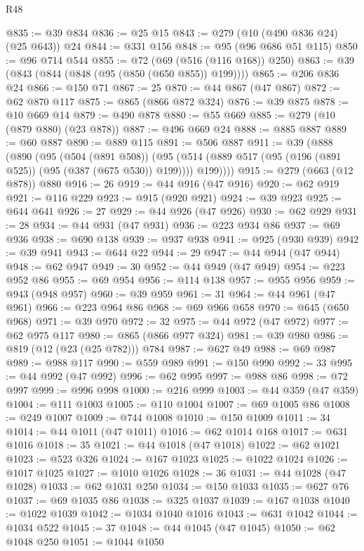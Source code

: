 \begin{lexlean}{R48}
\begin{coremodule}
@835 := @39 @834
@836 := @25 @15
@843 := @279 (@10 (@490 @836 @24) (@25 @643)) @24
@844 := @331 @156
@848 := @95 (@96 @686 @51 @115)
@850 := @96 @714 @544
@855 := @72 (@69 (@516 (@116 @168)) @250)
@863 := @39 (@843 (@844 (@848 (@95 (@850 (@650 @855)) @199))))
@865 := @206 @836 @24
@866 := @150 @71
@867 := 25
@870 := @44 @867 (@47 @867)
@872 := @62 @870 @117
@875 := @865 (@866 @872 @324)
@876 := @39 @875
@878 := @10 @669 @14
@879 := @490 @878
@880 := @55 @669
@885 := @279 (@10 (@879 @880) (@23 @878))
@887 := @496 @669 @24
@888 := @885 @887
@889 := @60 @887
@890 := @889 @115
@891 := @506 @887
@911 := @39
    (@888
      (@890
        (@95
          (@504 (@891 @508))
          (@95 (@514 (@889 @517 (@95 (@196 (@891 @525)) (@95 (@387 (@675 @530)) @199)))) @199))))
@915 := @279 (@663 (@12 @878)) @880
@916 := 26
@919 := @44 @916 (@47 @916)
@920 := @62 @919
@921 := @116 @229
@923 := @915 (@920 @921)
@924 := @39 @923
@925 := @644 @641
@926 := 27
@929 := @44 @926 (@47 @926)
@930 := @62 @929
@931 := 28
@934 := @44 @931 (@47 @931)
@936 := @223 @934 @86
@937 := @69 @936
@938 := @690 @138
@939 := @937 @938
@941 := @925 (@930 @939)
@942 := @39 @941
@943 := @644 @22
@944 := 29
@947 := @44 @944 (@47 @944)
@948 := @62 @947
@949 := 30
@952 := @44 @949 (@47 @949)
@954 := @223 @952 @86
@955 := @69 @954
@956 := @114 @138
@957 := @955 @956
@959 := @943 (@948 @957)
@960 := @39 @959
@961 := 31
@964 := @44 @961 (@47 @961)
@966 := @223 @964 @86
@968 := @69 @966 @658
@970 := @645 (@650 @968)
@971 := @39 @970
@972 := 32
@975 := @44 @972 (@47 @972)
@977 := @62 @975 @117
@980 := @865 (@866 @977 @324)
@981 := @39 @980
@986 := @819 (@12 (@23 (@25 @782))) @784
@987 := @627 @49
@988 := @69 @987
@989 := @988 @117
@990 := @559 @989
@991 := @150 @990
@992 := 33
@995 := @44 @992 (@47 @992)
@996 := @62 @995
@997 := @988 @86
@998 := @72 @997
@999 := @996 @998
@1000 := @216 @999
@1003 := @44 @359 (@47 @359)
@1004 := @111 @1003
@1005 := @110 @1004
@1007 := @69 @1005 @86
@1008 := @249 @1007
@1009 := @744 @1008
@1010 := @150 @1009
@1011 := 34
@1014 := @44 @1011 (@47 @1011)
@1016 := @62 @1014 @168
@1017 := @631 @1016
@1018 := 35
@1021 := @44 @1018 (@47 @1018)
@1022 := @62 @1021
@1023 := @523 @326
@1024 := @167 @1023
@1025 := @1022 @1024
@1026 := @1017 @1025
@1027 := @1010 @1026
@1028 := 36
@1031 := @44 @1028 (@47 @1028)
@1033 := @62 @1031 @250
@1034 := @150 @1033
@1035 := @627 @76
@1037 := @69 @1035 @86
@1038 := @325 @1037
@1039 := @167 @1038
@1040 := @1022 @1039
@1042 := @1034 @1040 @1016
@1043 := @631 @1042
@1044 := @1034 @522
@1045 := 37
@1048 := @44 @1045 (@47 @1045)
@1050 := @62 @1048 @250
@1051 := @1044 @1050

\end{coremodule}
\end{lexlean}
